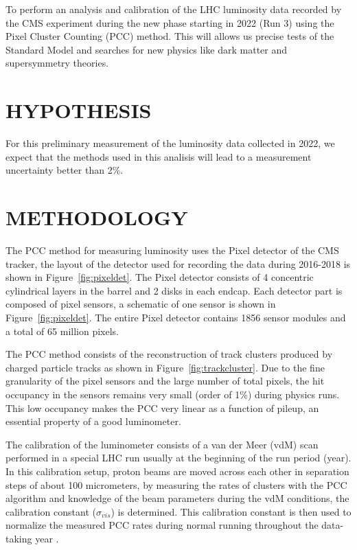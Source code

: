 \documentclass[final,12pt]{article}
\begin{document}
To perform an analysis and calibration of the LHC luminosity data recorded by the CMS experiment during the new phase starting in 2022 (Run 3) using the Pixel Cluster Counting (PCC) method.
This will allows us precise tests of the Standard Model and searches for new physics like dark matter and supersymmetry theories.


\section{HYPOTHESIS}

For this preliminary measurement of the luminosity data collected in 2022, we expect that the methods used in this analisis will lead to a measurement uncertainty better than 2\%. 



\section{METHODOLOGY}


The PCC method for measuring luminosity uses the Pixel detector of the CMS tracker, the layout of the  detector used for recording the data during 2016-2018 is shown in Figure~\ref{fig:pixeldet}.
The Pixel detector consists of 4 concentric cylindrical layers in the barrel and 2 disks in each endcap.
Each detector part is composed of pixel sensors, a schematic of one sensor is shown in Figure~\ref{fig:pixeldet}.
The entire Pixel detector contains 1856 sensor modules and a total of 65 million pixels.

The PCC method consists of the reconstruction of track clusters produced by charged particle tracks as shown in Figure~\ref{fig:trackcluster}.
Due to the fine granularity of the pixel sensors and the large number of total pixels, the hit occupancy in the sensors remains very small (order of 1\%) during physics runs.
This low occupancy makes the PCC  very linear as a function of pileup, an essential property of a good luminometer.

The calibration of the luminometer consists of a van der Meer (vdM) scan performed in a special LHC run usually at the beginning of the run period (year).
In this calibration setup, proton beams are moved across each other in separation steps of about 100 micrometers,
by measuring the rates of clusters with the PCC algorithm and knowledge of the beam parameters during the vdM conditions, the calibration constant ($\sigma_{vis}$) is determined.
This calibration constant is then used to normalize the measured PCC rates during normal running throughout the data-taking year \cite{pas:2018vdm}.
\end{document}
